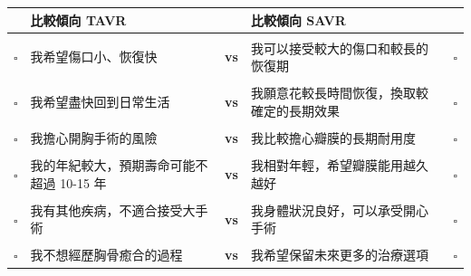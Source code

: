 \documentclass[12pt,a4paper]{article}
\begin{document}
\begin{tcolorbox}[colback=white, colframe=emergency_blue, arc=10pt, boxrule=2pt]

\begin{center}
\renewcommand{\arraystretch}{2}
\begin{tabular}{p{0.5cm}p{6cm}cp{6cm}p{0.5cm}}

& \textbf{\textcolor{emergency_blue}{比較傾向 TAVR}} & & \textbf{\textcolor{pda_green}{比較傾向 SAVR}} & \\[0.3cm]

\hline\\

$\square$ & 我希望傷口小、恢復快 & \textbf{vs} & 我可以接受較大的傷口和較長的恢復期 & $\square$ \\

\hline\\

$\square$ & 我希望盡快回到日常生活 & \textbf{vs} & 我願意花較長時間恢復，換取較確定的長期效果 & $\square$ \\

\hline\\

$\square$ & 我擔心開胸手術的風險 & \textbf{vs} & 我比較擔心瓣膜的長期耐用度 & $\square$ \\

\hline\\

$\square$ & 我的年紀較大，預期壽命可能不超過 10-15 年 & \textbf{vs} & 我相對年輕，希望瓣膜能用越久越好 & $\square$ \\

\hline\\

$\square$ & 我有其他疾病，不適合接受大手術 & \textbf{vs} & 我身體狀況良好，可以承受開心手術 & $\square$ \\

\hline\\

$\square$ & 我不想經歷胸骨癒合的過程 & \textbf{vs} & 我希望保留未來更多的治療選項 & $\square$ \\

\end{tabular}
\end{center}

\end{tcolorbox}

\vspace{0.8cm}
\end{document}
